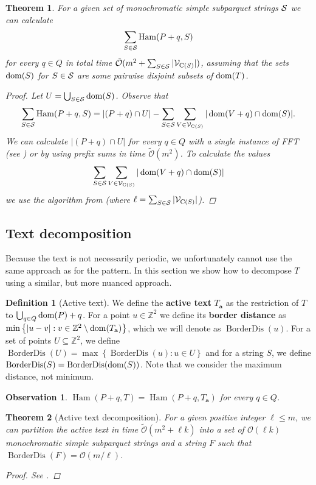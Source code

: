 \documentclass[11pt]{article}
\newcommand{\Z}{\mathbb{Z}}
\renewcommand{\O}{\mathcal{O}}
\newcommand{\tO}{\tilde{\mathcal{O}}}
\newcommand{\set}[1]{\left\lbrace #1 \right\rbrace}
\theoremstyle{plain}
\newtheorem{theorem}{Theorem}
\newtheorem{observation}{Observation}
\theoremstyle{definition}
\newtheorem{definition}{Definition}
\theoremstyle{remark}
\DeclareMathOperator*{\Ham}{Ham}
\DeclareMathOperator*{\BD}{BorderDis}
\begin{document}
\begin{theorem}\label{sparse_algo}
	For a given set of monochromatic simple subparquet strings $\S$ we can calculate
	$$ \sum_{S \in \S} \Ham(P + q, S) $$
	for every $q \in Q$ in total time $\tO(m^2 + \sum_{S \in \S} |\V_{\getchar{S}}|)$, assuming that the sets $\d{S}$ for $S \in \S$ are some pairwise disjoint subsets of $\d{T}$.
	\begin{proof}
		Let $U = \bigcup_{S \in \S} \d{S}$. Observe that
		$$ \sum_{S \in \S} \Ham(P + q, S) = |(P + q) \cap U| - \sum_{S \in \S}\sum_{V \in \V_{\getchar{S}}} |\d{V + q} \cap \d{S}|.$$
		We can calculate $|(P + q) \cap U|$ for every $q \in Q$ with a single instance of FFT (see ) or by using prefix sums in time $\tO(m^2)$.
		To calculate the values
		$$ \sum_{S \in \S}\sum_{V \in \V_{\getchar{S}}} |\d{V + q} \cap \d{S}| $$
		we use the algorithm from  (where $\ell = \sum_{S \in \S} |\V_{\getchar{S}}|$).
	\end{proof}
\end{theorem}


\subsection{Text decomposition}
Because the text is not necessarily periodic, we unfortunately cannot use the same approach as for the pattern.
In this section we show how to decompose $T$ using a similar, but more nuanced approach.


\newcommand{\Ta}{T_\mathbf{a}}
\begin{definition}[Active text]
	We define the \textbf{active text} $\Ta$ as the restriction of $T$ to $\bigcup_{q \in Q} \d{P} + q$.
	For a point $u \in \Z^2$ we define its \textbf{border distance} as
	$\min\set{|u - v| : v \in \Z^2 \setminus \d{\Ta}} $,
	which we will denote as $\BD(u)$.
	For a set of points $U \subseteq \Z^2$, we define $\BD(U) = \max\set{\BD(u) : u \in U}$ and for a string $S$, we define $\BD(S) = \BD(\d{S})$.
	Note that we consider the maximum distance, not minimum.
\end{definition}


\begin{observation}
	$\Ham(P + q, T) = \Ham(P + q, \Ta)$ for every $q \in Q$.
\end{observation}


\begin{theorem}[Active text decomposition]\label{text_decomposition}
	For a given positive integer $\ell \le m$, we can partition the active text in time $\tO(m^2 + \ell k)$ into a set of $\O(\ell k)$ monochromatic simple subparquet strings
	and a string $F$ such that $\BD(F) = \O(m / \ell)$.
	\begin{proof} See . \end{proof}
\end{theorem}
\end{document}
